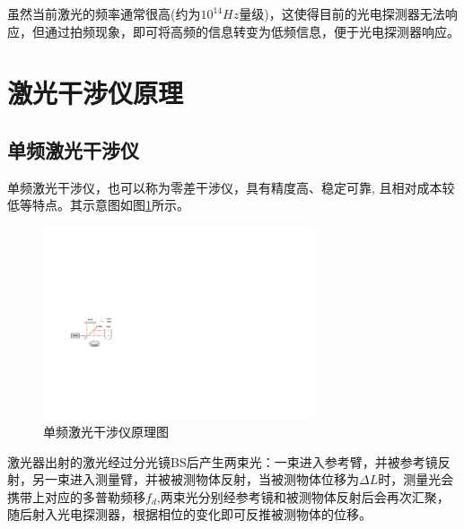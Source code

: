 虽然当前激光的频率通常很高(约为\(10^{14}Hz\)量级)，这使得目前的光电探测器无法响应\cite{张志平2022激光外差干涉技术在光刻机中的应用}，但通过拍频现象，即可将高频的信息转变为低频信息，便于光电探测器响应。

\section{激光干涉仪原理}
\subsection{单频激光干涉仪}
单频激光干涉仪，也可以称为零差干涉仪，具有精度高、稳定可靠, 且相对成本较低等特点\cite{零差干涉仪用于振动校准中关键技术的研究}。其示意图如图\ref{fig:单频激光干涉仪原理图}所示。
\begin{figure}[htb]
    \centering
    \includegraphics[width=8cm]{fig/2-fig/单频激光干涉仪原理图.drawio.pdf}
    \caption{单频激光干涉仪原理图}
    \label{fig:单频激光干涉仪原理图}
\end{figure}

激光器出射的激光经过分光镜BS后产生两束光：一束进入参考臂，并被参考镜反射，另一束进入测量臂，并被被测物体反射，当被测物体位移为\(\Delta L\)时，测量光会携带上对应的多普勒频移\(f_d\),两束光分别经参考镜和被测物体反射后会再次汇聚，随后射入光电探测器，根据相位的变化即可反推被测物体的位移。

